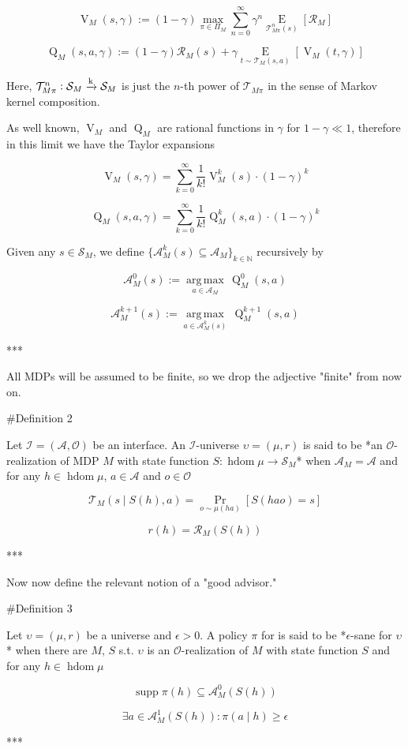 \documentclass[a4paper]{article}
\DeclareMathOperator{\Supp}{supp}
\newcommand{\E}[1]{\underset{#1}{\operatorname{E}}}
\newcommand{\Argmax}[1]{\underset{#1}{\operatorname{arg\,max}}\,}
\newcommand{\Nats}{\mathbb{N}}
\newcommand{\Sq}[2]{\{#1\}_{#2 \in \Nats}}
\newcommand{\M}{\xrightarrow{\textnormal{k}}}
\newcommand{\Ob}{\mathcal{O}}
\newcommand{\A}{\mathcal{A}}
\newcommand{\St}{\mathcal{S}}
\newcommand{\T}{\mathcal{T}}
\newcommand{\R}{\mathcal{R}}
\newcommand{\In}{\mathcal{I}}
\DeclareMathOperator{\HD}{hdom}
\newcommand{\V}{\operatorname{V}}
\newcommand{\Q}{\operatorname{Q}}
\begin{document}
$$\V_M(s,\gamma):=(1-\gamma)\max_{\pi \in \Pi_M} \sum_{n=0}^\infty \gamma^n \E{\T_{M\pi}^n(s)}\left[\R_M\right]$$

$$\Q_M(s,a,\gamma):=(1-\gamma)\R_M(s)+\gamma\E{t \sim \T_M(s,a)}\left[\V_M(t,\gamma)\right]$$

Here, $\T_{M\pi}^n: \St_M \M \St_M$ is just the $n$-th power of $\T_{M\pi}$ in the sense of Markov kernel composition.

As well known, $\V_M$ and $\Q_M$ are rational functions in $\gamma$ for $1-\gamma \ll 1$, therefore in this limit we have the Taylor expansions

$$\V_M(s,\gamma)=\sum_{k=0}^\infty {\frac{1}{k!} \V_M^k(s)\cdot(1-\gamma)^k}$$

$$\Q_M(s,a,\gamma)=\sum_{k=0}^\infty {\frac{1}{k!} \Q_M^k(s,a)\cdot(1-\gamma)^k}$$

Given any $s \in \St_M$, we define $\Sq{\A_M^k(s) \subseteq \A_M}{k}$ recursively by

$$\A^0_M(s) := \Argmax{a \in \A_M} \Q_M^0(s,a)$$

$$\A^{k+1}_M(s) := \Argmax{a \in \A_M^k(s)} \Q_M^{k+1}(s,a)$$

***

All MDPs will be assumed to be finite, so we drop the adjective "finite" from now on.

\#Definition 2

Let $\In=(\A,\Ob)$ be an interface. An $\In$-universe $\upsilon=(\mu,r)$ is said to be *an $\Ob$-realization of MDP $M$ with state function $S: \HD{\mu} \rightarrow \St_M$* when $\A_M=\A$ and for any $h \in \HD{\mu}$, $a \in \A$ and $o \in \Ob$

$$\T_M\left(s \mid S(h),a\right) =\Pr_{o \sim \mu(ha)}\left[S(hao)=s\right]$$

$$r(h)=\R_M\left(S(h)\right)$$

***

Now now define the relevant notion of a "good advisor."

\#Definition 3

Let $\upsilon = (\mu,r)$ be a universe and $\epsilon > 0$. A policy $\pi$ for is said to be *$\epsilon$-sane for $\upsilon$* when there are $M$, $S$ s.t. $\upsilon$ is an $\Ob$-realization of $M$ with state function $S$ and for any $h \in \HD{\mu}$

$$\Supp{\pi(h)} \subseteq \A_M^0\left(S(h)\right)$$

$$\exists a \in \A_M^1\left(S(h)\right): \pi(a \mid h) \geq \epsilon$$

***
\end{document}
